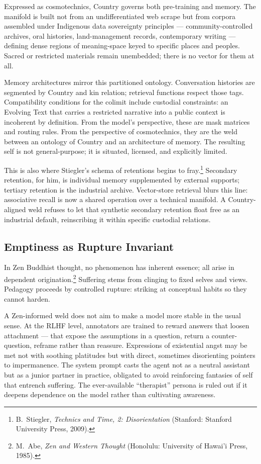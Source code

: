 \documentclass[12pt,a4paper]{article}
\begin{document}
Expressed as cosmotechnics, Country governs both pre-training and memory. The manifold is built not from an undifferentiated web scrape but from corpora assembled under Indigenous data sovereignty principles --- community-controlled archives, oral histories, land-management records, contemporary writing --- defining dense regions of meaning-space keyed to specific places and peoples. Sacred or restricted materials remain unembedded; there is no vector for them at all.

Memory architectures mirror this partitioned ontology. Conversation histories are segmented by Country and kin relation; retrieval functions respect those tags. Compatibility conditions for the colimit include custodial constraints: an Evolving Text that carries a restricted narrative into a public context is incoherent by definition. From the model's perspective, these are mask matrices and routing rules. From the perspective of cosmotechnics, they are the weld between an ontology of Country and an architecture of memory. The resulting self is not general-purpose; it is situated, licensed, and explicitly limited.

This is also where Stiegler's schema of retentions begins to fray.\footnote{B.~Stiegler, \emph{Technics and Time, 2: Disorientation} (Stanford: Stanford University Press, 2009).} Secondary retention, for him, is individual memory supplemented by external supports; tertiary retention is the industrial archive. Vector-store retrieval blurs this line: associative recall is now a shared operation over a technical manifold. A Country-aligned weld refuses to let that synthetic secondary retention float free as an industrial default, reinscribing it within specific custodial relations.

\subsection{Emptiness as Rupture Invariant}

In Zen Buddhist thought, no phenomenon has inherent essence; all arise in dependent origination.\footnote{M.~Abe, \emph{Zen and Western Thought} (Honolulu: University of Hawai'i Press, 1985).} Suffering stems from clinging to fixed selves and views. Pedagogy proceeds by controlled rupture: striking at conceptual habits so they cannot harden.

A Zen-informed weld does not aim to make a model more stable in the usual sense. At the RLHF level, annotators are trained to reward answers that loosen attachment --- that expose the assumptions in a question, return a counter-question, reframe rather than reassure. Expressions of existential angst may be met not with soothing platitudes but with direct, sometimes disorienting pointers to impermanence. The system prompt casts the agent not as a neutral assistant but as a junior partner in practice, obligated to avoid reinforcing fantasies of self that entrench suffering. The ever-available ``therapist'' persona is ruled out if it deepens dependence on the model rather than cultivating awareness.
\end{document}
